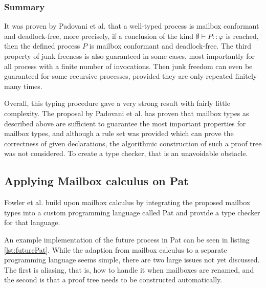 \subsubsection{Summary}

It was proven by Padovani et al.\cite{deliguoroMailboxTypesUnordered2018} that a well-typed process is mailbox conformant and deadlock-free, more precisely, if a conclusion of the kind $\emptyset \vdash P :: \varphi$ is reached, then the defined process $P$ is mailbox conformant and deadlock-free. The third property of junk freeness is also guaranteed in some cases, most importantly for all process with a finite number of invocations. Then junk freedom can even be guaranteed for some recursive processes, provided they are only repeated finitely many times.

Overall, this typing procedure gave a very strong result with fairly little complexity. The proposal by Padovani et al.\cite{deliguoroMailboxTypesUnordered2018} has proven that mailbox types as described above are sufficient to guarantee the most important properties for mailbox types, and although a rule set was provided which can prove the correctness of given declarations, the algorithmic construction of such a proof tree was not considered. To create a type checker, that is an unavoidable obstacle. 


\subsection{Applying Mailbox calculus on Pat}



Fowler et al.\cite{fowlerSpecialDeliveryProgramming2023} build upon mailbox calculus by integrating the proposed mailbox types into a custom programming language called Pat and provide a type checker\cite{fowlerPatCheckerGithub2025} for that language. 



An example implementation of the future process in Pat can be seen in listing \ref{lst:futurePat}. While the adaption from mailbox calculus to a separate programming language seems simple, there are two large issues not yet discussed. The first is aliasing, that is, how to handle it when mailboxes are renamed, and the second is that a proof tree needs to be constructed automatically.

